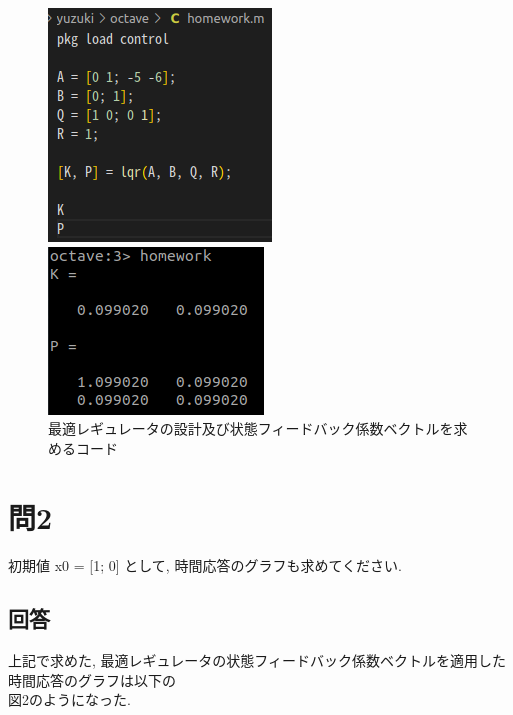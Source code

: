 \documentclass{jsarticle}
\begin{document}
\begin{figure}[htbp]
  \begin{minipage}[t]{0.5\linewidth}
    \centering
    \includegraphics[keepaspectratio, scale=0.65]{fig/2.png}
  \end{minipage}
  \begin{minipage}[t]{0.5\linewidth}
    \centering
    \includegraphics[keepaspectratio, scale=0.90]{fig/1.png}
  \end{minipage}\vspace*{2mm}
  \caption{最適レギュレータの設計及び状態フィードバック係数ベクトルを求めるコード}
\end{figure}



\vspace*{1mm}\section*{問2}
初期値 x0 = [1; 0] として, 時間応答のグラフも求めてください.\\

\vspace*{4mm}\subsection*{回答}
上記で求めた, 最適レギュレータの状態フィードバック係数ベクトルを適用した時間応答のグラフは以下の\\
\hspace*{1zw}図2のようになった.\\
\end{document}
